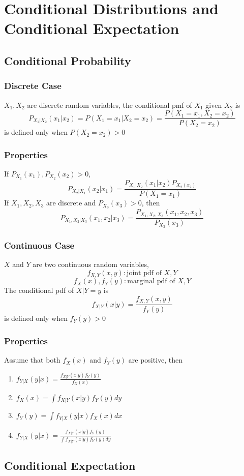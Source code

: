 \documentclass[11pt]{article}
\begin{document}
\section{Conditional Distributions and Conditional Expectation}
\subsection{Conditional Probability}
\subsubsection*{Discrete Case}
$X_1,X_2$ are discrete random variables, the conditional pmf of $X_1$ given $X_2$ is
\[P_{X_1|X_2}(x_1|x_2)=P(X_1=x_1|X_2=x_2)=\frac{P(X_1=x_1,X_2=x_2)}{P(X_2=x_2)}\]
is defined only when $P(X_2=x_2)>0$ 
\subsubsection*{Properties}
If $P_{X_1}(x_1), P_{X_2}(x_2)>0$, 
\[P_{X_2|X_1}(x_2|x_1)=\frac{P_{X_1|X_2}(x_1|x_2)P_{X_2(x_2)}}{P(X_1=x_1)}\]
If $X_1,X_2,X_3$ are discrete and $P_{X_3}(x_3)>0$, then
\[P_{X_1,X_2|X_3}(x_1,x_2|x_3)=\frac{P_{X_1,X_2,X_3}(x_1,x_2,x_3)}{P_{X_3}(x_3)}\]
\subsubsection*{Continuous Case}
$X$ and $Y$ are two continuous random variables, 
\[f_{X,Y}(x,y): \text{joint pdf of }X,Y\]
\[f_X(x), f_Y(y): \text{marginal pdf of }X,Y\]
The conditional pdf of $X|Y=y$ is 
\[f_{X|Y}(x|y)=\frac{f_{X,Y}(x,y)}{f_Y(y)}\]
is defined only when $f_Y(y)>0$
\subsubsection*{Properties}
Assume that both $f_X(x)$ and $f_Y(y)$ are positive, then
\begin{enumerate}
    \item $\displaystyle f_{Y|X}(y|x)=\frac{f_{X|Y}(x|y)f_Y(y)}{f_X(x)}$
    \item $\displaystyle f_X(x)=\int f_{X|Y}(x|y)f_Y(y)dy$
    \item $\displaystyle f_Y(y)=\int f_{Y|X}(y|x)f_X(x)dx$
    \item $\displaystyle f_{Y|X}(y|x) = \frac{f_{X|Y}(x|y)f_Y(y)}{\int f_{X|Y}(x|y)f_Y(y)dy}$
\end{enumerate}
\subsection{Conditional Expectation}
\end{document}

